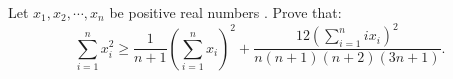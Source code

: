 Let $ x_1,  x_2, \cdots, x_n$ be  positive real  numbers . Prove that:$$\sum_ {i = 1}^n x_i ^2\geq \frac {1} {n + 1} \left (\sum_ {i = 1}^n x_i \right)^2+\frac{12(\sum_ {i = 1}^n i x_i)^2}{n (n + 1) (n + 2) (3n + 1)}. $$